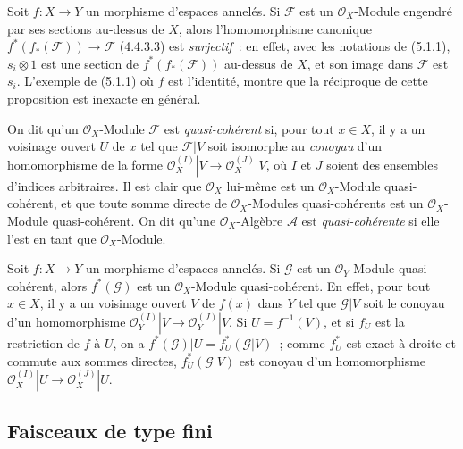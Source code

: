 \begin{env}[5.1.2]
\label{0.5.1.2-fr}
Soit $f:X\to Y$ un morphisme d'espaces annelés. Si $\mathcal{F}$ est un
$\mathcal{O}_X$-Module engendré par ses sections au-dessus de $X$, alors
l'homomorphisme canonique
$f^*(f_*(\mathcal{F}))\to\mathcal{F}$ (4.4.3.3) est \emph{surjectif}~: en
effet, avec les notations de (5.1.1), $s_i\otimes1$ est une section de
$f^*(f_*(\mathcal{F}))$ au-dessus de $X$, et son image dans $\mathcal{F}$ est
$s_i$. L'exemple de (5.1.1) où $f$ est l'identité, montre que la réciproque de
cette proposition est inexacte en général.
\end{env}

\begin{env}[5.1.3]
\label{0.5.1.3-fr}
On dit qu'un $\mathcal{O}_X$-Module $\mathcal{F}$ est \emph{quasi-cohérent}
si, pour tout $x\in X$, il y a un voisinage ouvert $U$ de $x$ tel que
$\mathcal{F}|V$ soit isomorphe au \emph{conoyau} d'un homomorphisme de la
forme
$\mathcal{O}_X^{(I)}|V\to\mathcal{O}_X^{(J)}|V$, où $I$ et $J$ soient des
ensembles d'indices arbitraires. Il est clair que $\mathcal{O}_X$ lui-même est
un $\mathcal{O}_X$-Module quasi-cohérent, et que toute somme directe de
$\mathcal{O}_X$-Modules quasi-cohérents est un $\mathcal{O}_X$-Module
quasi-cohérent. On dit qu'une $\mathcal{O}_X$-Algèbre $\mathcal{A}$ est
\emph{quasi-cohérente} si elle l'est en tant que $\mathcal{O}_X$-Module.
\end{env}

\begin{env}[5.1.4]
\label{0.5.1.4-fr}
Soit $f:X\to Y$ un morphisme d'espaces annelés. Si $\mathcal{G}$ est un
$\mathcal{O}_Y$-Module quasi-cohérent, alors $f^*(\mathcal{G})$ est un
$\mathcal{O}_X$-Module quasi-cohérent. En effet, pour tout $x\in X$, il y a
un voisinage ouvert $V$ de $f(x)$ dans $Y$ tel que $\mathcal{G}|V$ soit le
conoyau d'un homomorphisme
$\mathcal{O}_Y^{(I)}|V\to\mathcal{O}_Y^{(J)}|V$. Si $U=f^{-1}(V)$, et si
$f_U$ est la restriction de $f$ à $U$, on a
$f^*(\mathcal{G})|U=f_U^*(\mathcal{G}|V)$~; comme $f_U^*$ est exact à droite
et commute aux sommes directes, $f_U^*(\mathcal{G}|V)$ est conoyau d'un
homomorphisme
$\mathcal{O}_X^{(I)}|U\to\mathcal{O}_X^{(J)}|U$.
\end{env}

\subsection{Faisceaux de type fini}
\label{subsection:0.5.2-fr}


